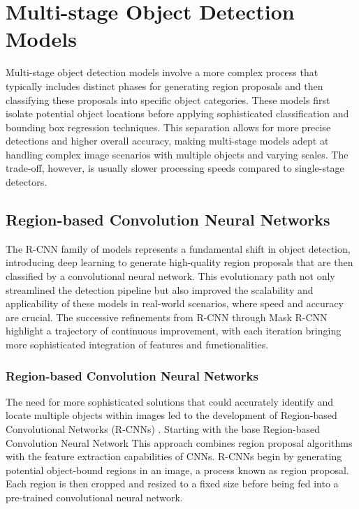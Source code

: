 \section{Multi-stage Object Detection Models}

Multi-stage object detection models involve a more complex process that typically includes distinct phases for generating region proposals and then classifying 
these proposals into specific object categories. These models first isolate potential object locations before applying sophisticated classification and 
bounding box regression techniques. This separation allows for more precise detections and higher overall accuracy, making multi-stage models adept at 
handling complex image scenarios with multiple objects and varying scales. The trade-off, however, is usually slower processing speeds compared to 
single-stage detectors.

\subsection{Region-based Convolution Neural Networks}

The R-CNN family of models represents a fundamental shift in object detection, introducing deep learning to generate high-quality region proposals 
that are then classified by a convolutional neural network. This evolutionary path not only streamlined the detection pipeline but also improved the 
scalability and applicability of these models in real-world scenarios, where speed and accuracy are crucial. The successive refinements from R-CNN 
through Mask R-CNN highlight a trajectory of continuous improvement, with  each iteration bringing more sophisticated integration of features and functionalities.


\subsubsection{Region-based Convolution Neural Networks}

The need for more sophisticated solutions that could accurately identify and locate multiple objects within images led to the development of 
Region-based Convolutional Networks (R-CNNs) \cite{rcnn}. Starting with the base Region-based Convolution Neural Network This approach combines region proposal 
algorithms with the feature extraction capabilities of CNNs. R-CNNs begin by generating potential object-bound regions in an image, a process known 
as region proposal. Each region is then cropped and resized to a fixed size before being fed into a pre-trained convolutional neural network. 

